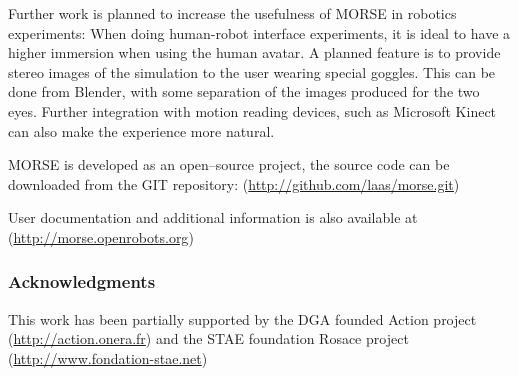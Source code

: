 \documentclass{llncs}
\begin{document}
Further work is planned to increase the usefulness of MORSE in robotics
experiments:
When doing human-robot interface experiments, it is ideal to have a higher
immersion when using the human avatar.  A planned feature is to provide stereo
images of the simulation to the user wearing special goggles. This can be done
from Blender, with some separation of the images produced for the two eyes.
Further integration with motion reading devices, such as Microsoft Kinect can
also make the experience more natural.



MORSE is developed as an open--source project, the source code can be
downloaded from the GIT repository:
(\url{http://github.com/laas/morse.git})

User documentation and additional information is also available at
(\url{http://morse.openrobots.org})


\subsubsection*{Acknowledgments}
This work has been partially supported by the DGA founded Action project
(\url{http://action.onera.fr}) and the STAE foundation Rosace project
(\url{http://www.fondation-stae.net})



\end{document}

